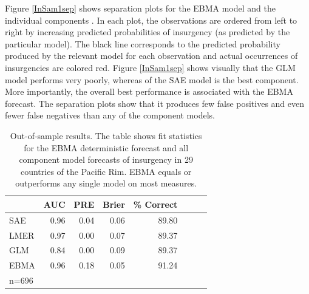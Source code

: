 \documentclass[pdftex,12pt,fullpage,oneside]{amsart}
\begin{document}
Figure \ref{InSam1sep} shows separation plots for the EBMA model and
the individual components \citep{Greenhill:2011}. In each plot, the
observations are ordered from left to right by increasing predicted
probabilities of insurgency (as predicted by the particular
model). The black line corresponds to the predicted probability
produced by the relevant model for each observation and actual
occurrences of insurgencies are colored red.  Figure \ref{InSam1sep}
shows visually that the GLM model performs very poorly, whereas of the
SAE model is the best component.  More importantly, the overall best
performance is associated with the EBMA forecast. The separation plots
show that it produces few false positives and even fewer
false negatives than any of the component models.




\begin{table}
\small
\begin{center}
  \caption{\footnotesize Out-of-sample results. The table shows fit
    statistics for the EBMA deterministic forecast and all component
    model forecasts of insurgency in 29 countries of the Pacific
    Rim. EBMA equals or outperforms any single model on most
    measures.}\label{OutSam1}
\begin{tabular}{l rrrrrrr}
  \toprule
 & AUC & PRE & Brier & \% Correct \\ 
  \midrule
  SAE &  0.96 & 0.04 & 0.06 & 89.80 \\ 
  LMER & 0.97 & 0.00 & 0.07 & 89.37\\ 
  GLM & 0.84 & 0.00 & 0.09 & 89.37\\ 
  EBMA & 0.96 & 0.18 & 0.05 & 91.24 \\ 
   \bottomrule
n=696 \\
\end{tabular}
\end{center}

\end{table}
\end{document}
